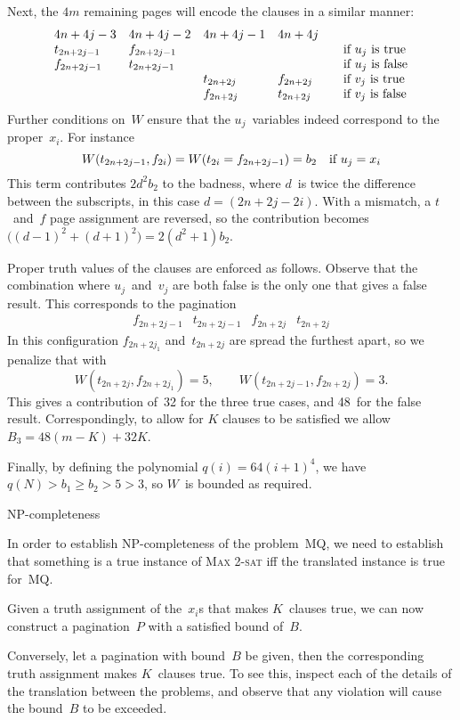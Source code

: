 Next, the $4m$ remaining pages will encode the clauses in a similar
manner:
\[ \begin{array}{lllll}
4n+4j-3&4n+4j-2&4n+4j-1&4n+4j\\
t_{2n+2j-1}&f_{2n+2j-1}&&&\quad\hbox{if $u_j$ is true}\\
f_{2n+2j-1}&t_{2n+2j-1}&&&\quad\hbox{if $u_j$ is false}\\
&&t_{2n+2j}&f_{2n+2j}&\quad\hbox{if $v_j$ is true}\\
&&f_{2n+2j}&t_{2n+2j}&\quad\hbox{if $v_j$ is false}
\end{array}
\]
Further conditions on~$W$ ensure that the $u_j$~variables indeed
correspond to the proper~$x_i$. For instance
\[ W(t_{2n+2j-1},f_{2i}) = W(t_{2i}=f_{2n+2j-1})=b_2
    \quad\hbox{if $u_j=x_i$}
\]
This term contributes $2d^2b_2$ to the badness, where $d$~is twice the
difference between the subscripts, in this case $d=(2n+2j-2i)$.
With a mismatch, a $t$~and~$f$ page assignment are reversed, so the
contribution becomes $\bigl((d-1)^2+(d+1)^2\bigr)=2(d^2+1)b_2$.

Proper truth values of the clauses are enforced as follows. Observe
that the
combination where $u_j$~and~$v_j$ are both false is the only one that
gives a false result. This corresponds to the pagination
\[ \begin{array}{llll}f_{2n+2j-1}&t_{2n+2j-1}&f_{2n+2j}&t_{2n+2j}
    \end{array}
\]
In this configuration $f_{2n+2j_1}$ and~$t_{2n+2j}$ are spread the
furthest apart, so we penalize that with
\[ W(t_{2n+2j},f_{2n+2j_1})=5, \qquad
   W(t_{2n+2j-1},f_{2n+2j})=3.
\]
This gives a contribution of~32 for the three true cases, and 48~for
the false result. Correspondingly,
to allow for $K$ clauses to be satisfied we allow $B_3=48(m-K)+32K$.

Finally, by defining the polynomial $q(i)=64(i+1)^4$, we have
$q(N)>b_1\geq b_2>5>3$, so $W$~is bounded as required.

 {NP-completeness}

In order to establish NP-completeness of the problem~\textsc{MQ}, we need to
establish that something is a true instance of \textsc{Max 2-sat} iff
the translated instance is true for~\textsc{MQ}.

Given
a truth assignment of the~$x_i$s that makes $K$~clauses true,
we can now construct
a pagination~$P$ with a satisfied bound of~$B$.

Conversely, let a pagination with bound~$B$ be given, then the
corresponding truth assignment makes $K$~clauses true. To see this,
inspect each of the details of the translation between the problems,
and observe that any violation will cause the bound~$B$ to be exceeded.

